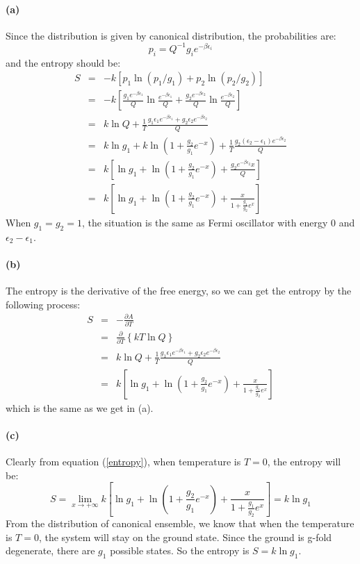\documentclass{article}
\begin{document}
	\paragraph{(a)} Since the distribution is given by canonical distribution, the probabilities are:
	$$
	p_i = Q^{-1}g_ie^{-\beta \epsilon_i}
	$$
	and the entropy should be:
	\begin{eqnarray}\label{entropy}
	S &=& -k\left[p_1\ln(p_1/g_1)+p_2\ln(p_2/g_2)\right]\nonumber\\
	&=& -k\left[\frac{g_1e^{-\beta \epsilon_1}}{Q}\ln \frac{e^{-\beta\epsilon_1}}{Q}+\frac{g_2e^{-\beta \epsilon_2}}{Q}\ln \frac{e^{-\beta\epsilon_2}}{Q}\right]\nonumber\\
	&=& k\ln Q + \frac{1}{T}\frac{g_1\epsilon_1e^{-\beta\epsilon_1}+g_2\epsilon_2e^{-\beta\epsilon_2}}{Q}\nonumber\\
	&=&k\ln g_1 + k\ln\left(1+\frac{g_2}{g_1}e^{-x}\right)+\frac{1}{T}\frac{g_2(\epsilon_2-\epsilon_1)e^{-\beta\epsilon_2}}{Q}\nonumber\\
	&=&k\left[\ln g_1 + \ln\left(1+\frac{g_2}{g_1}e^{-x}\right)+\frac{g_2e^{-\beta\epsilon_2}x}{Q}\right]\nonumber\\
	&=&k\left[\ln g_1 + \ln\left(1+\frac{g_2}{g_1}e^{-x}\right)+\frac{x}{1+\frac{g_1}{g_2}e^x}\right]
	\end{eqnarray}
	When $g_1=g_2=1$, the situation is the same as Fermi oscillator with energy $0$ and $\epsilon_2-\epsilon_1$.
	\paragraph{(b)}
	The entropy is the derivative of the free energy, so we can get the entropy by the following process:
	\begin{eqnarray}
	S &=& -\frac{\partial A}{\partial T}\nonumber\\
	&=&\frac{\partial}{\partial T}\left\{kT\ln Q\right\}\nonumber\\
	&=&k\ln Q +\frac{1}{T}\frac{g_1\epsilon_1e^{-\beta\epsilon_1}+g_2\epsilon_2e^{-\beta\epsilon_2}}{Q}\nonumber\\
	&=&k\left[\ln g_1 + \ln\left(1+\frac{g_2}{g_1}e^{-x}\right)+\frac{x}{1+\frac{g_1}{g_2}e^x}\right]
	\end{eqnarray}
	which is the same as we get in (a).
	\paragraph{(c)}
	Clearly from equation (\ref{entropy}), when temperature is $T=0$, the entropy will be:
	\begin{equation}
	S = \lim_{x\rightarrow +\infty}k\left[\ln g_1 + \ln\left(1+\frac{g_2}{g_1}e^{-x}\right)+\frac{x}{1+\frac{g_1}{g_2}e^x}\right]=k\ln g_1
	\end{equation}
	From the distribution of canonical ensemble, we know that when the temperature is $T=0$, the system will stay on the ground state. Since the ground is g-fold degenerate, there are $g_1$ possible states. So the entropy is $S = k\ln g_1$.
\end{document}
